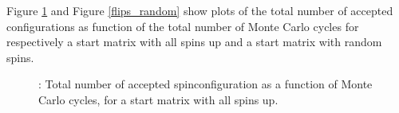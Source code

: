 \documentclass{article}
\begin{document}
{{Figure \ref{fig:flips} and Figure \ref{flips_random} show plots of the total number of accepted configurations as function of the total number of Monte Carlo cycles for respectively a start matrix with all spins up and a start matrix with random spins.

\begin{figure}
\caption{: Total number of accepted spinconfiguration as a function of Monte Carlo cycles, for a start matrix with all spins up. }
\label{fig:flips}
\end{figure}

}}
\end{document}

